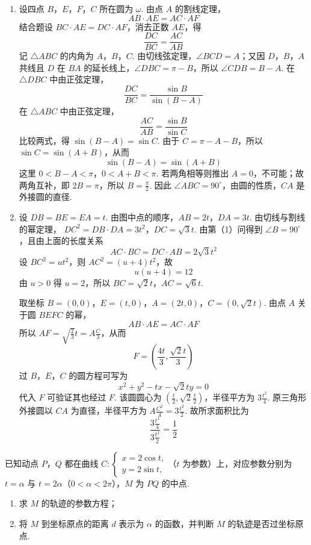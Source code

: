 \begin{solution}
\begin{enumerate}
\item 设四点 \(B\)，\(E\)，\(F\)，\(C\) 所在圆为 \(\omega\). 由点 \(A\) 的割线定理，
\[
AB\cdot AE=AC\cdot AF
\]
结合题设 \(BC\cdot AE=DC\cdot AF\)，消去正数 \(AE\)，得
\[
\frac{DC}{BC}=\frac{AC}{AB}
\]
记 \(\triangle ABC\) 的内角为 \(A\)，\(B\)，\(C\). 由切线弦定理，\(\angle BCD=A\)；又因 \(D\)，\(B\)，\(A\) 共线且 \(D\) 在 \(BA\) 的延长线上，\(\angle DBC=\pi-B\)，所以 \(\angle CDB=B-A\). 在 \(\triangle DBC\) 中由正弦定理，
\[
\frac{DC}{BC}=\frac{\sin B}{\sin(B-A)}
\]
在 \(\triangle ABC\) 中由正弦定理，
\[
\frac{AC}{AB}=\frac{\sin B}{\sin C}
\]
比较两式，得 \(\sin(B-A)=\sin C\). 由于 \(C=\pi-A-B\)，所以 \(\sin C=\sin(A+B)\)，从而
\[
\sin(B-A)=\sin(A+B)
\]
这里 \(0<B-A<\pi\)，\(0<A+B<\pi\). 若两角相等则推出 \(A=0\)，不可能；故两角互补，即 \(2B=\pi\)，所以 \(B=\frac{\pi}{2}\). 因此 \(\angle ABC=90^\circ\)，由圆的性质，\(CA\) 是外接圆的直径.

\item 设 \(DB=BE=EA=t\). 由图中点的顺序，\(AB=2t\)，\(DA=3t\). 由切线与割线的幂定理，
\(DC^2=DB\cdot DA=3t^2\)，\(DC=\sqrt3t\).
由第（1）问得到 \(\angle B=90^\circ\)，且由上面的长度关系
\[
AC\cdot BC=DC\cdot AB=2\sqrt3t^2
\]
设 \(BC^2=ut^2\)，则 \(AC^2=(u+4)t^2\)，故
\[
u(u+4)=12
\]
由 \(u>0\) 得 \(u=2\)，所以 \(BC=\sqrt2t\)，\(AC=\sqrt6t\).

取坐标 \(B=(0,0)\)，\(E=(t,0)\)，\(A=(2t,0)\)，\(C=(0,\sqrt2t)\). 由点 \(A\) 关于圆 \(BEFC\) 的幂，
\[
AB\cdot AE=AC\cdot AF
\]
所以 \(AF=\sqrt{\frac{2}{3}}t=A\frac{C}{3}\)，从而
\[
F=\left(\frac{4t}{3},\frac{\sqrt2t}{3}\right)
\]
过 \(B\)，\(E\)，\(C\) 的圆方程可写为
\[
x^2+y^2-tx-\sqrt2ty=0
\]
代入 \(F\) 可验证其也经过 \(F\). 该圆圆心为 \((\frac{t}{2},\sqrt2\frac{t}{2})\)，半径平方为 \(3\frac{t^2}{4}\). 原三角形外接圆以 \(CA\) 为直径，半径平方为 \(A\frac{C^2}{4}=3\frac{t^2}{2}\). 故所求面积比为
\[
\frac{3\frac{t^2}{4}}{3\frac{t^2}{2}}=\frac12
\]
\end{enumerate}
\end{solution}

\begin{problem}
已知动点 \(P\)，\(Q\) 都在曲线 \(C: \begin{cases}
x = 2\cos t,\\
y = 2\sin t,
\end{cases}\)（\(t\) 为参数）上，对应参数分别为 \(t = \alpha\) 与 \(t = 2\alpha\)（\(0 < \alpha < 2\pi\)），\(M\) 为 \(PQ\) 的中点.

\begin{enumerate}
\item 求 \(M\) 的轨迹的参数方程；
\item 将 \(M\) 到坐标原点的距离 \(d\) 表示为 \(\alpha\) 的函数，并判断 \(M\) 的轨迹是否过坐标原点.
\end{enumerate}
\end{problem}

